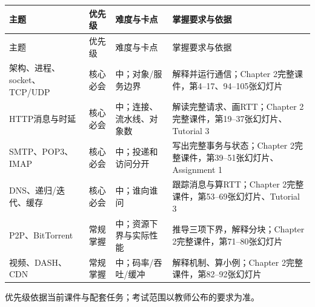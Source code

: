 \begingroup
\small\setlength{\tabcolsep}{3pt}
\renewcommand{\arraystretch}{1.22}
\begin{longtable}{@{}>{\raggedright\arraybackslash}p{}>{\raggedright\arraybackslash}p{}>{\raggedright\arraybackslash}p{}>{\raggedright\arraybackslash}p{}@{}}
\toprule
主题 & 优先级 & 难度与卡点 & 掌握要求与依据 \\
\midrule\endfirsthead
主题 & 优先级 & 难度与卡点 & 掌握要求与依据 \\
\midrule\endhead
\bottomrule\endfoot
架构、进程、socket、TCP/UDP & 核心必会 & 中；对象/服务边界 & 解释并运行通信；Chapter 2完整课件，第4–17、94–105张幻灯片 \\
HTTP消息与时延 & 核心必会 & 中；连接、流水线、对象数 & 解读完整请求、画RTT；Chapter 2完整课件，第19–37张幻灯片、Tutorial 3 \\
SMTP、POP3、IMAP & 核心必会 & 中；投递和访问分开 & 写出完整事务与状态；Chapter 2完整课件，第39–51张幻灯片、Assignment 1 \\
DNS、递归/迭代、缓存 & 核心必会 & 中；谁向谁问 & 跟踪消息与算RTT；Chapter 2完整课件，第53–69张幻灯片、Tutorial 3 \\
P2P、BitTorrent & 常规掌握 & 中；资源下界与实际性能 & 推导三项下界，解释分块；Chapter 2完整课件，第71–80张幻灯片 \\
视频、DASH、CDN & 常规掌握 & 中；码率/吞吐/缓冲 & 解释机制、算小例；Chapter 2完整课件，第82–92张幻灯片 \\
\end{longtable}
\endgroup

优先级依据当前课件与配套任务；考试范围以教师公布的要求为准。



